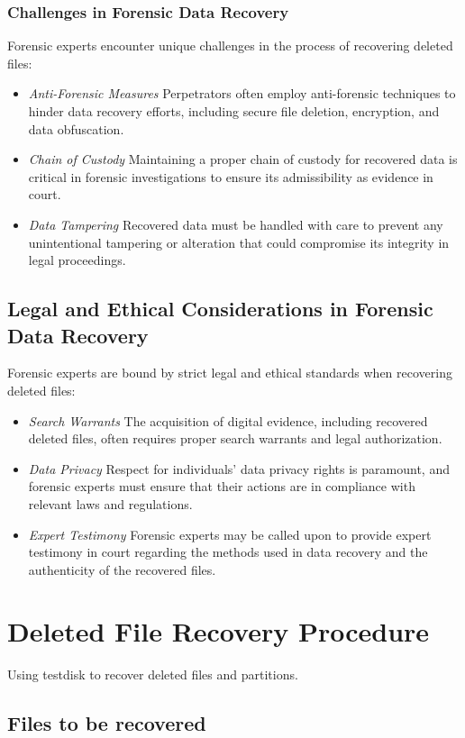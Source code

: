 \documentclass[11pt]{article}
\begin{document}
\subsubsection{Challenges in Forensic Data Recovery}
Forensic experts encounter unique challenges in the process of recovering deleted files:
\begin{itemize}
  \item \textit{Anti-Forensic Measures} Perpetrators often employ anti-forensic techniques to hinder data recovery efforts, including secure file deletion, encryption, and data obfuscation.
  \item \textit{Chain of Custody} Maintaining a proper chain of custody for recovered data is critical in forensic investigations to ensure its admissibility as evidence in court.
  \item \textit{Data Tampering} Recovered data must be handled with care to prevent any unintentional tampering or alteration that could compromise its integrity in legal proceedings.
\end{itemize}

\subsection{Legal and Ethical Considerations in Forensic Data Recovery}
Forensic experts are bound by strict legal and ethical standards when recovering deleted files:
\begin{itemize}
  \item \textit{Search Warrants} The acquisition of digital evidence, including recovered deleted files, often requires proper search warrants and legal authorization.
  \item \textit{Data Privacy} Respect for individuals' data privacy rights is paramount, and forensic experts must ensure that their actions are in compliance with relevant laws and regulations.
  \item \textit{Expert Testimony} Forensic experts may be called upon to provide expert testimony in court regarding the methods used in data recovery and the authenticity of the recovered files.
\end{itemize}

\section{Deleted File Recovery Procedure}
Using testdisk to recover deleted files and partitions.

\subsection*{Files to be recovered}
\end{document}
